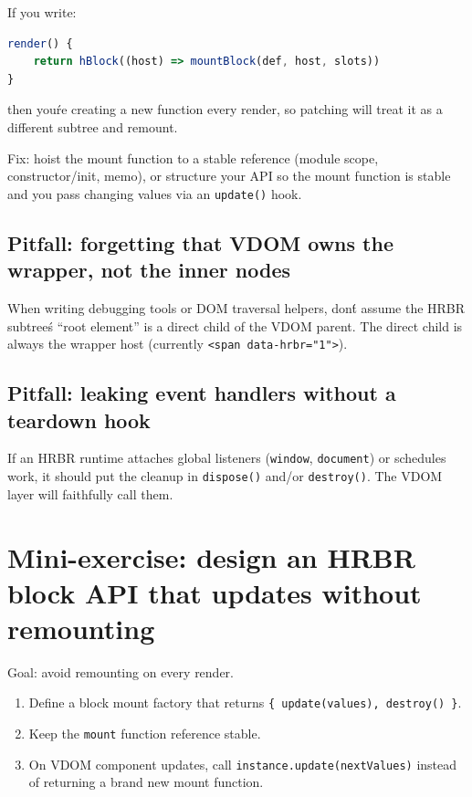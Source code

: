 If you write:

\begin{lstlisting}[language=JavaScript]
render() {
	return hBlock((host) => mountBlock(def, host, slots))
}
\end{lstlisting}

then you\'re creating a new function every render, so patching will treat it as a different subtree and remount.

Fix: hoist the mount function to a stable reference (module scope, constructor/init, memo), or structure your API so the mount function is stable and you pass changing values via an \texttt{update()} hook.

\subsection{Pitfall: forgetting that VDOM owns the wrapper, not the inner nodes}

When writing debugging tools or DOM traversal helpers, don\'t assume the HRBR subtree\'s ``root element'' is a direct child of the VDOM parent.
The direct child is always the wrapper host (currently \texttt{<span data-hrbr="1">}).

\subsection{Pitfall: leaking event handlers without a teardown hook}

If an HRBR runtime attaches global listeners (\texttt{window}, \texttt{document}) or schedules work, it should put the cleanup in \texttt{dispose()} and/or \texttt{destroy()}.
The VDOM layer will faithfully call them.

\section{Mini-exercise: design an HRBR block API that updates without remounting}

Goal: avoid remounting on every render.

\begin{enumerate}
\item Define a block mount factory that returns \texttt{\{ update(values), destroy() \}}.
\item Keep the \texttt{mount} function reference stable.
\item On VDOM component updates, call \texttt{instance.update(nextValues)} instead of returning a brand new mount function.
\end{enumerate}


